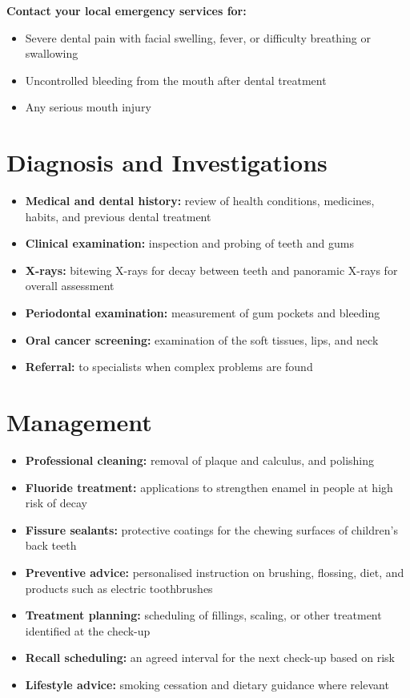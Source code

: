 \textbf{Contact your local emergency services for:}
\begin{itemize}
    \item Severe dental pain with facial swelling, fever, or difficulty breathing or swallowing
    \item Uncontrolled bleeding from the mouth after dental treatment
    \item Any serious mouth injury
\end{itemize}

\section*{Diagnosis and Investigations}
\begin{itemize}
    \item \textbf{Medical and dental history:} review of health conditions, medicines, habits, and previous dental treatment
    \item \textbf{Clinical examination:} inspection and probing of teeth and gums
    \item \textbf{X-rays:} bitewing X-rays for decay between teeth and panoramic X-rays for overall assessment
    \item \textbf{Periodontal examination:} measurement of gum pockets and bleeding
    \item \textbf{Oral cancer screening:} examination of the soft tissues, lips, and neck
    \item \textbf{Referral:} to specialists when complex problems are found
\end{itemize}

\section*{Management}
\begin{itemize}
    \item \textbf{Professional cleaning:} removal of plaque and calculus, and polishing
    \item \textbf{Fluoride treatment:} applications to strengthen enamel in people at high risk of decay
    \item \textbf{Fissure sealants:} protective coatings for the chewing surfaces of children's back teeth
    \item \textbf{Preventive advice:} personalised instruction on brushing, flossing, diet, and products such as electric toothbrushes
    \item \textbf{Treatment planning:} scheduling of fillings, scaling, or other treatment identified at the check-up
    \item \textbf{Recall scheduling:} an agreed interval for the next check-up based on risk
    \item \textbf{Lifestyle advice:} smoking cessation and dietary guidance where relevant
\end{itemize}

